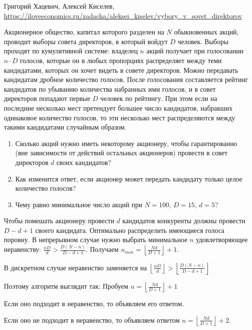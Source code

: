 \begin{problem}  \par
\begin{source}
Григорий Хацевич, Алексей Киселев, \url{https://iloveeconomics.ru/zadacha/aleksei_kiselev/vybory_v_sovet_direktorov}
\end{source}
Акционерное общество, капитал которого разделен на $N$ обыкновенных акций, проводит выборы совета директоров, в который войдут $D$ человек. Выборы проходят по кумулятивной системе: владелец $n$ акций получает при голосовании $n\cdot D$ голосов, которые он в любых пропорциях распределяет между теми кандидатами, которых он хочет видеть в совете директоров. Можно передавать кандидатам дробное количество голосов. После голосования составляется рейтинг кандидатов по убыванию количества набранных ими голосов, и в совет директоров попадают первые $D$ человек по рейтингу. При этом если на последние несколько мест претендует большее число кандидатов, набравших одинаковое количество голосов, то эти несколько мест распределяются между такими кандидатами случайным образом. \par

\begin{enumerate}
\item Сколько акций нужно иметь некоторому акционеру, чтобы гарантированно (вне зависимости от действий остальных акционеров)  провести в совет директоров $d$ своих кандидатов? \par

\item Как изменится ответ, если акционер может передать кандидату только целое количество голосов? \par

\item Чему равно минимальное число акций при $N=100$, $D=15$, $d=5$?
\end{enumerate}


\begin{sol}

Чтобы помешать акционеру провести $d$ кандидатов конкуренты должны провести $D-d+1$ своего кандидата. Оптимально распределить имеющиеся голоса поровну.
В непрерывном случае нужно выбрать минимальное $n$ удовлетворяющее неравенству: $\frac{nD}{d}>\frac{D(N-n)}{D-d+1}$. Получаем $n_{min}= \left\lfloor \frac{Nd}{D+1}\right\rfloor+1$. \par
В дискретном случае неравенство заменяется на
$\left\lfloor \frac{nD}{d}\right\rfloor>\left\lfloor \frac{D(N-n)}{D-d+1}\right\rfloor$ \par
Поэтому алгоритм выглядит так:
Пробуем $n=\left\lfloor \frac{Nd}{D+1}\right\rfloor+1$ \par
Если оно подходит в неравенство, то объявляем его ответом. \par
Если оно не подходит в неравенство, то объявляем ответом $n=\left\lfloor \frac{Nd}{D+1}\right\rfloor+2$.
\end{sol}
\end{problem}






